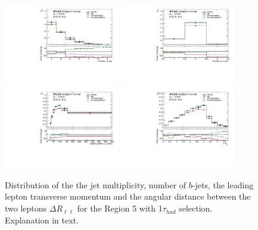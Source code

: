 \begin{figure}[!htb]
\centering
\includegraphics[width=0.45\textwidth]{Plots/ttV/generator/c_Region_4_nJets}
\includegraphics[width=0.45\textwidth]{Plots/ttV/generator/c_Region_4_nBtagJets}\\
\includegraphics[width=0.45\textwidth]{Plots/ttV/generator/c_Region_4_lep_Pt_0} 
\includegraphics[width=0.45\textwidth]{Plots/ttV/generator/c_Region_4_DRll01}\\
  \caption{Distribution of the the jet multiplicity, number of $b$-jets, the leading lepton transverse momentum and the angular distance between the two leptons  $\Delta R _{\ell \ell }$ for the Region 5 with 1$\tau_{had}$ selection. Explanation in text.
   \label{ttV:den_tauR_kin}}
\end{figure}
% 
